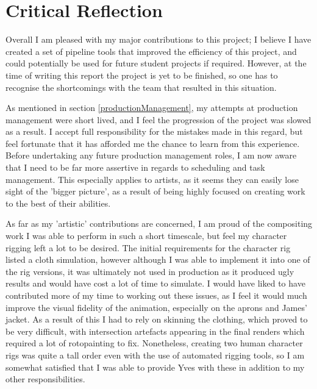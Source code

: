 \documentclass[11pt]{article}
\begin{document}
\newpage

\section{Critical Reflection}

Overall I am pleased with my major contributions to this project; I believe I have created a set of pipeline tools that improved the efficiency of this project, and could potentially be used for future student projects if required. However, at the time of writing this report the project is yet to be finished, so one has to recognise the shortcomings with the team that resulted in this situation.

As mentioned in section \ref{productionManagement}, my attempts at production management were short lived, and I feel the progression of the project was slowed as a result. I accept full responsibility for the mistakes made in this regard, but feel fortunate that it has afforded me the chance to learn from this experience. Before undertaking any future production management roles, I am now aware that I need to be far more assertive in regards to scheduling and task management. This especially applies to artists, as it seems they can easily lose sight of the 'bigger picture', as a result of being highly focused on creating work to the best of their abilities.

As far as my 'artistic' contributions are concerned, I am proud of the compositing work I was able to perform in such a short timescale, but feel my character rigging left a lot to be desired. The initial requirements for the character rig listed a cloth simulation, however although I was able to implement it into one of the rig versions, it was ultimately not used in production as it produced ugly results and would have cost a lot of time to simulate. I would have liked to have contributed more of my time to working out these issues, as I feel it would much improve the visual fidelity of the animation, especially on the aprons and James' jacket. As a result of this I had to rely on skinning the clothing, which proved to be very difficult, with intersection artefacts appearing in the final renders which required a lot of rotopainting to fix. Nonetheless, creating two human character rigs was quite a tall order even with the use of automated rigging tools, so I am somewhat satisfied that I was able to provide Yves with these in addition to my other responsibilities.
\end{document}
